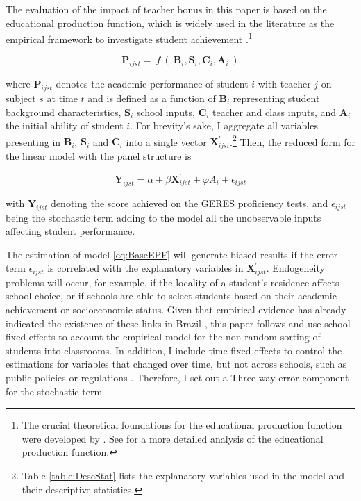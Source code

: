 \documentclass[a4paper, 12pt]{article}
\begin{document}
The evaluation of the impact of teacher bonus in this paper is based on the educational production function, which is widely used in the literature as the empirical framework to investigate student achievement \citep{hanushek2012distribution}.\footnote{The crucial theoretical foundations for the educational production function were developed by \citet{hanushek1971teacher, hanushek1979conceptual, summers1977schools, boardman1979using, margo1986educational}. See \citet{hanushek2008education, todd2003specification, hanushek2002publicly, pritchett1999education} for a more detailed analysis of the educational production function.} 



\begin{equation} \label{eq:ProdFunction}
\mathbf{P}_{ijst} = \:f\:( \: \mathbf{B}_i, \mathbf{S}_i, \mathbf{C}_i, \mathbf{A}_{i} \:)
\end{equation}


where $\mathbf{P}_{ijst}$ denotes the academic performance of student $i$ with teacher $j$ on subject $s$ at time $t$ and is defined as a function of $\mathbf{B}_i$ representing student background characteristics, $\mathbf{S}_i$ school inputs, $\mathbf{C}_i$ teacher and class inputs, and $\mathbf{A}_{i}$ the initial ability of student $i$. For brevity's sake, I aggregate all variables presenting in $\mathbf{B}_i$, $\mathbf{S}_i$ and $\mathbf{C}_i$ into a single vector $\mathbf{X}_{ijst}^{\prime}$.\footnote{Table \ref{table:DescStat} lists the explanatory variables used in the model and their descriptive statistics.} Then, the reduced form for the linear model with the panel structure is


\begin{equation} \label{eq:BaseEPF}
\mathbf{Y}_{ijst} = \alpha + \beta\mathbf{X}_{ijst}^{\prime} + \varphi A_{i} + \epsilon_{ijst}  
\end{equation}


with $\mathbf{Y}_{ijst}$ denoting the score achieved on the GERES proficiency tests, and $\epsilon_{ijst}$ being the stochastic term adding to the model all the unobservable inputs affecting student performance. 




The estimation of model \eqref{eq:BaseEPF} will generate biased results if the error term $\epsilon_{ijst}$ is correlated with the explanatory variables in $\mathbf{X}_{ijst}^{\prime}$. Endogeneity problems will occur, for example, if the locality of a student’s residence affects school choice, or if schools are able to select students based on their academic achievement or socioeconomic status. Given that empirical evidence has already indicated the existence of these links in Brazil \citep[see e.g.][]{alves2015seleccao, bartholo2013measuring}, this paper follows \citet{imberman2015incentive, schwerdt2011traditional, wossmann2006class} and use school-fixed effects to account the empirical model for the non-random sorting of students into classrooms. In addition, I include time-fixed effects to control the estimations for variables that changed over time, but not across schools, such as public policies or regulations \citep{deschenes2018quasi}. Therefore, I set out a Three-way error component for the stochastic term 
\end{document}
